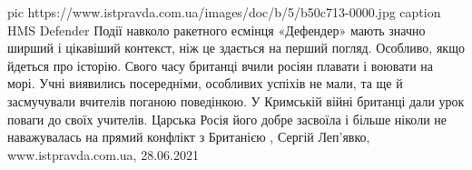  
 
 
 
 


\ifcmt
  pic https://www.istpravda.com.ua/images/doc/b/5/b50c713-0000.jpg
	caption HMS Defender
\fi
Події навколо ракетного есмінця «Дефендер» мають значно ширший і цікавіший
контекст, ніж це здається на перший погляд. Особливо, якщо йдеться про історію.
Свого часу британці вчили росіян плавати і воювати на морі. Учні виявились
посередніми, особливих успіхів не мали, та ще й засмучували вчителів поганою
поведінкою. У Кримській війні британці дали урок поваги до своїх учителів.
Царська Росія його добре засвоїла і більше ніколи не наважувалась на прямий
конфлікт з Британією
, 
Сергій Леп'явко, www.istpravda.com.ua, 28.06.2021

